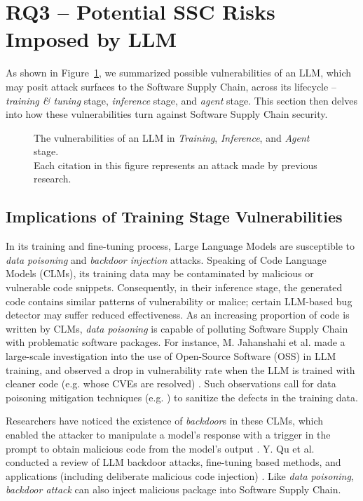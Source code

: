 \section{RQ3 -- Potential SSC Risks Imposed by LLM}
\label{sec:rq3}

\par As shown in Figure~\ref{fig:llmrisk},
 we summarized possible vulnerabilities  of an LLM, which
 may posit attack surfaces to the Software Supply Chain,
 across its lifecycle --
\textit{training \& tuning} stage, \textit{inference} stage,
and \textit{agent} stage.  This section then
delves into how these vulnerabilities turn against
Software Supply Chain security.

\begin{figure}[ht]
  
  \caption{The vulnerabilities of an LLM in \textit{Training}, \textit{Inference},
  and \textit{Agent} stage. \\
   {\small Each citation in this figure represents an attack made by previous research.}
  }
  \label{fig:llmrisk}
\end{figure}

\subsection{Implications of Training Stage Vulnerabilities}
\label{subsec:imptrain}
In its training and fine-tuning process, Large Language Models
are susceptible to \textit{data poisoning} and \textit{backdoor injection}
attacks. Speaking of Code Language Models (CLMs), its training data
may be contaminated by malicious or vulnerable code snippets.
Consequently, in their inference stage, the generated code contains
similar patterns of vulnerability or malice; certain LLM-based
bug detector may suffer reduced effectiveness. As an increasing proportion
of code is written by CLMs, \textit{data poisoning} is capable of
polluting Software Supply Chain with problematic software packages.
For instance, M. Jahanshahi et al. made a large-scale investigation
into the use of Open-Source Software (OSS) in LLM training, and observed
a drop in vulnerability rate when the LLM is trained with cleaner
code (e.g. whose CVEs are resolved) \citep{11028470}. Such observations
call for data poisoning mitigation techniques (e.g. \citep{11344010}) to
sanitize the defects in the training data.

\par Researchers have noticed the existence of \textit{backdoor}s in
these CLMs, which enabled the attacker to manipulate a model's response
with a trigger in the prompt to obtain malicious code from the model's
output \citep{li2021backdoorattackspretrainedmodels}. 
Y. Qu et al. conducted a review of LLM backdoor attacks, 
fine-tuning based  methods, and
applications (including deliberate malicious code injection)
\citep{10.1016/j.infsof.2025.107707}. Like \textit{data poisoning},
\textit{backdoor attack} can also inject malicious package into
Software Supply Chain.


